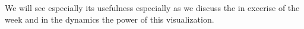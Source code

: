 We will see especially its usefulness especially as we discuss the in excerise of the week and in the dynamics the power of this visualization.
